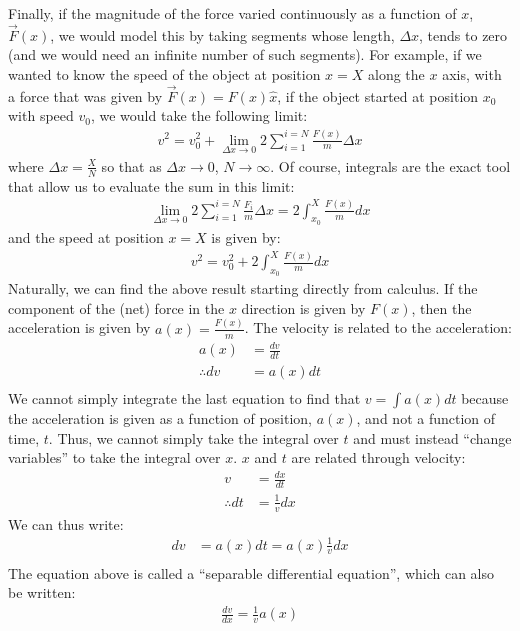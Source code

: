 Finally, if the magnitude of the force varied continuously as a function of $x$, $\vec F(x)$, we would model this by taking segments whose length, $\Delta x$, tends to zero (and we would need an infinite number of such segments). For example, if we wanted to know the speed of the object at position $x=X$ along the $x$ axis, with a force that was given by $\vec F(x)=F(x)\hat x$, if the object started at position $x_0$ with speed $v_0$, we would take the following limit:
\begin{align*}
v^2 = v_0^2 + \lim_{\Delta x \to 0} 2\sum_{i=1}^{i=N} \frac{F(x)}{m}\Delta x
\end{align*}
where $\Delta x = \frac{X}{N}$ so that as $\Delta x\to 0$, $N\to\infty$. Of course, integrals are the exact tool that allow us to evaluate the sum in this limit:
\begin{align*}
\lim_{\Delta x \to 0} 2\sum_{i=1}^{i=N} \frac{F_i}{m}\Delta x =2 \int_{x_0}^{X}\frac{F(x)}{m}dx 
\end{align*}
and the speed at position $x=X$ is given by:
\begin{align*}
v^2 = v_0^2 + 2 \int_{x_0}^{X}\frac{F(x)}{m}dx 
\end{align*}
Naturally, we can find the above result starting directly from calculus. If the component of the (net) force in the $x$ direction is given by $F(x)$, then the  acceleration is given by $a(x) = \frac{F(x)}{m}$. The velocity is related to the acceleration:
\begin{align*}
a(x) &= \frac{dv}{dt}\\
\therefore dv &= a(x)dt\\
\end{align*}
We cannot simply integrate the last equation to find that $v=\int a(x)dt$ because the acceleration is given as a function of position, $a(x)$, and not a function of time, $t$. Thus, we cannot simply take the integral over $t$ and must instead ``change variables'' to take the integral over $x$. $x$ and $t$ are related through velocity:
\begin{align*}
v &= \frac{dx}{dt}\\
\therefore dt &= \frac{1}{v}dx
\end{align*}
We can thus write:
\begin{align*}
dv &= a(x)dt = a(x)\frac{1}{v}dx \\
\end{align*}
The equation above is called a ``separable differential equation'', which can also be written:
\begin{align*}
\frac{dv}{dx}=\frac{1}{v}a(x)
\end{align*}
